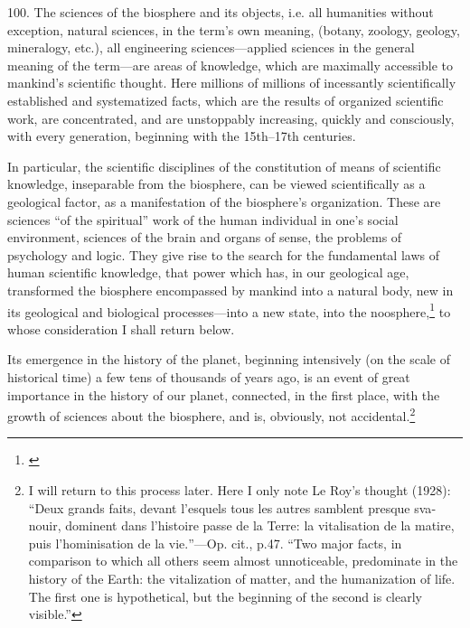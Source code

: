 
100. The sciences of the biosphere and its objects, i.e. all humanities
without exception, natural sciences, in the term's own meaning, (botany,
zoology, geology, mineralogy, etc.), all engineering sciences---applied
sciences in the general meaning of the term---are areas of knowledge, which are
maximally accessible to mankind's scientific thought.  Here millions of
millions of incessantly scientifically established and systematized facts,
which are the results of organized scientific work, are concentrated, and are
unstoppably increasing, quickly and consciously, with every generation,
beginning with the 15th--17th centuries.

In particular, the scientific disciplines of the constitution of means of
scientific knowledge, inseparable from the biosphere, can be viewed
scientifically as a geological factor, as a manifestation of the biosphere's
organization.  These are sciences ``of the spiritual'' work of the human
individual in one's social environment, sciences of the brain and organs of
sense, the problems of psychology and logic.  They give rise to the search for
the fundamental laws of human scientific knowledge, that power which has, in
our geological age, transformed the biosphere encompassed by mankind into a
natural body, new in its geological and biological processes---into a new
state, into the noosphere,\footnote{
	\foreignlanguage{french}{}
} to whose consideration I shall return below.

Its emergence in the history of the planet, beginning intensively (on the
scale of historical time) a few tens of thousands of years ago, is an event of
great importance in the history of our planet, connected, in the first place,
with the growth of sciences about the biosphere, and is, obviously, not
accidental.\footnote{
	I will return to this process later.  Here I only note Le Roy's thought
	(1928): \foreignquote{french}{Deux grands faits, devant l'esquels tous
	les autres samblent presque svanouir, dominent dans l'histoire passe de
	la Terre: la vitalisation de la matire, puis l'hominisation de la
	vie.}---Op. cit., p.47.  \enquote{Two major facts, in comparison to
	which all others seem almost unnoticeable, predominate in the history
	of the Earth: the vitalization of matter, and the humanization of life.
	The first one is hypothetical, but the beginning of the second is
	clearly visible.}}

